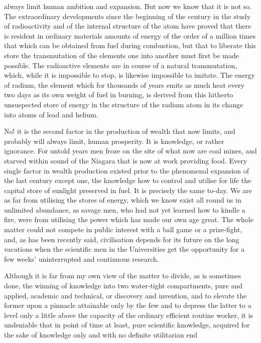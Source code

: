 \documentclass[10.5pt,twoside]{book}
\newcommand{\origpage}[1]{\clearpage\setcounter{page}{#1}}
\begin{document}
\origpage{22}

\noindent always limit human ambition and expansion. But now we know that it
is not so. The extraordinary developments since the beginning of the century
in the study of radioactivity and of the internal structure of the atom have
proved that there is resident in ordinary materials amounts of energy of the
order of a million times that which can be obtained from fuel during
combustion, but that to liberate this store the transmutation of the elements
one into another must first be made possible. The radioactive elements are in
course of a natural transmutation, which, while it is impossible to stop, is
likewise impossible to imitate. The energy of radium, the element which for
thousands of years emits as much heat every two days as its own weight of fuel
in burning, is derived from this hitherto unsuspected store of energy in the
structure of the radium atom in its change into atoms of lead and helium.

No! it is the second factor in the production of wealth that now limits, and
probably will always limit, human prosperity. It is knowledge, or rather
ignorance. For untold years men froze on the site of what now are coal mines,
and starved within sound of the Niagara that is now at work providing food.
Every single factor in wealth production existed prior to the phenomenal
expansion of the last century except one, the knowledge how to control and
utilise for life the capital store of sunlight preserved in fuel. It is
precisely the same to-day. We are as far from utilising the stores of energy,
which we know exist all round us in unlimited abundance, as savage men, who
had not yet learned how to kindle a fire, were from utilising the power which
has made our own age great. The whole matter could not compete in public
interest with a ball game or a prize-fight, and, as has been recently said,
civilisation depends for its future on the long vacations when the scientific
men in the Universities get the opportunity for a few weeks' uninterrupted and
continuous research.

Although it is far from my own view of the matter to divide, as is sometimes
done, the winning of knowledge into two water-tight compartments, pure and
applied, academic and technical, or discovery and invention, and to elevate
the former upon a pinnacle attainable only by the few and to depress the
latter to a level only a little above the capacity of the ordinary efficient
routine worker, it is undeniable that in point of time at least, pure
scientific knowledge, acquired for the sake of knowledge only and with no
definite utilitarian end
\end{document}
